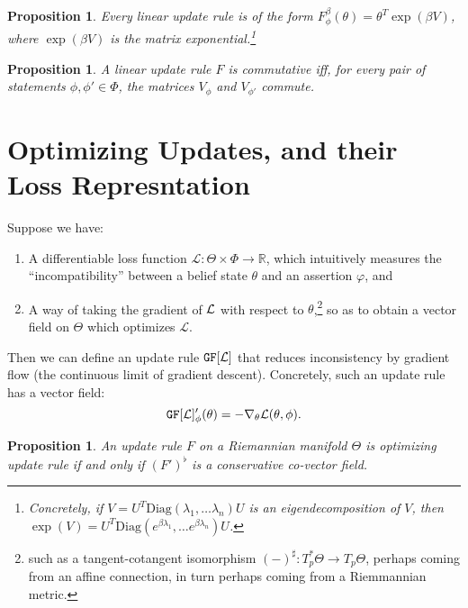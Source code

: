 \documentclass{uai2023}
\theoremstyle{plain}
\newtheorem{prop}[theorem]{Proposition}
\theoremstyle{definition}
\begin{document}
\begin{prop}
Every linear update rule is of the form
$
    F^{\beta}_\phi(\theta) =  \theta^{T} \exp(\beta V)
$,
where $\exp(\beta V)$ is the matrix exponential.\footnote{Concretely, if $V = U^T \mathrm{Diag}(\lambda_1, \ldots \lambda_n) U$ is an eigendecomposition of $V$, then $\exp(V) = U^T \mathrm{Diag}(e^{\beta\lambda_1}, \ldots e^{\beta\lambda_n}) U$.}
\end{prop}

\begin{prop}
A linear update rule $F$ is commutative iff, for every pair of statements  $\phi, \phi' \in \Phi$, the
matrices $V_\phi$ and $V_{\phi'}$ commute.
\end{prop}
 
\section{Optimizing Updates, and their
    Loss Represntation}
Suppose we have:
\begin{enumerate}[nosep]
	\item A differentiable loss function $\mathcal L : \Theta \times \Phi  \to \mathbb R$, which intuitively measures the ``incompatibility'' between a belief state $\theta$ and an assertion $\varphi$, and
	\item
A way of taking the gradient of ${\cal L}$ with respect to $\theta$,\footnote{
			such as a tangent-cotangent isomorphism $(-)^\sharp : T^*_p\Theta \to T_p \Theta$, perhaps coming from an affine connection, in turn perhaps coming from a Riemmannian metric.}
        so as to obtain a vector field on $\Theta$ which optimizes $\mathcal L.$
\end{enumerate}
\def\GD#1{\mathtt{GF}[#1]}
\def\NGD#1{\mathtt{NGF}[#1]}

Then we can define an update rule $\GD {\cal L}$ that reduces inconsistency by gradient flow (the continuous limit of gradient descent). Concretely, such an update rule has a vector field:
\[
	\GD {\cal L}'_\phi(\theta) = - \nabla_\theta {\cal L}(\theta,\phi).
\]


\begin{prop}
	An update rule $F$ on a Riemannian manifold $\Theta$ is optimizing update rule if and only if $(F')^\flat$ is a conservative co-vector field.
	\cite[Prop 11.40]{lee2013smooth}
\end{prop}
\end{document}
